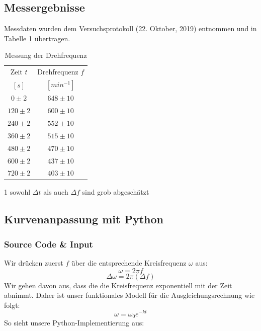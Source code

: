 \documentclass[a4paper,10pt]{article}
\begin{document}
\subsection{Messergebnisse}
Messdaten wurden dem Versuchsprotokoll (22. Oktober, 2019) entnommen und in Tabelle \ref{tab:Tab1} übertragen.
\unboldmath
\begin{table}[htb]
\centering
\caption{Messung der Drehfrequenz}\label{tab:Tab1}
\begin{threeparttable}
\begin{tabular}{cc}
\toprule
Zeit \boldmath\(t\)\unboldmath & Drehfrequenz \boldmath\(f\)\unboldmath \\
\([s]\)&\([min^{-1}]\)\\
\midrule
\(0\pm2\)&\(648\pm10\)\\
\(120\pm2\)&\(600\pm10\)\\
\(240\pm2\)&\(552\pm10\)\\
\(360\pm2\)&\(515\pm10\)\\
\(480\pm2\)&\(470\pm10\)\\
\(600\pm2\)&\(437\pm10\)\\
\(720\pm2\)&\(403\pm10\)\\
  \bottomrule
 \end{tabular}
\begin{tablenotes}
\raggedright
\item[1]sowohl \boldmath\(\Delta t \) als auch \(\Delta f \) sind grob abgeschätzt\unboldmath
\end{tablenotes}
\end{threeparttable}\end{table}
\boldmath

\subsection{Kurvenanpassung mit Python}
\subsubsection{Source Code \& Input}
Wir drücken zuerst \(f\) über die entsprechende Kreisfrequenz \(\omega\) aus:
\begin{equation} \label{eq:omega}
	\omega=2\pi f
\end{equation} 
\begin{equation} \label{eq:Deltaomega}
	\Delta\omega=2\pi (\Delta f)
\end{equation} 
Wir gehen davon aus, dass die die Kreisfrequenz exponentiell mit der Zeit abnimmt.
Daher ist unser funktionales Modell für die Ausgleichungsrechnung wie folgt:
\begin{equation} \label{eq:Fit1}
	\boxed{\omega=\omega_{0} e^{-k t}}
\end{equation} 
So sieht unsere Python-Implementierung aus:\\
\end{document}
